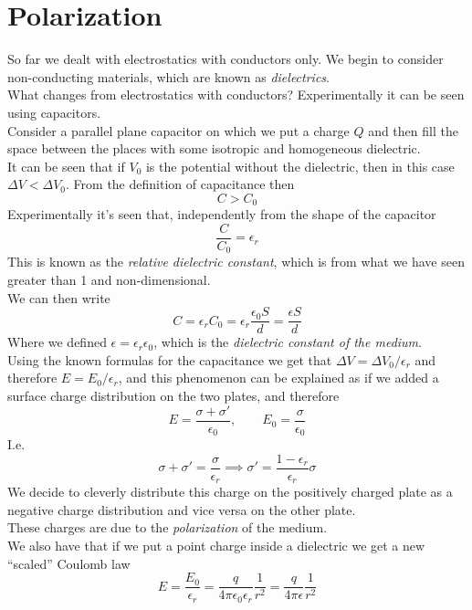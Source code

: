 \documentclass[../electromagnetism]{subfiles}
\begin{document}
\section{Polarization}
So far we dealt with electrostatics with conductors only. We begin to consider non-conducting materials, which are known as \textit{dielectrics}.\\
What changes from electrostatics with conductors? Experimentally it can be seen using capacitors.\\
Consider a parallel plane capacitor on which we put a charge $Q$ and then fill the space between the places with some isotropic and homogeneous dielectric.\\
It can be seen that if $V_0$ is the potential without the dielectric, then in this case $\Delta V<\Delta V_0$. From the definition of capacitance then
\begin{equation*}
	C>C_0
\end{equation*}
Experimentally it's seen that, independently from the shape of the capacitor
\begin{equation}
	\frac{C}{C_0}=\epsilon_r
	\label{eq:dielectricconst}
\end{equation}
This is known as the \textit{relative dielectric constant}, which is from what we have seen greater than 1 and non-dimensional.\\
We can then write
\begin{equation}
	C=\epsilon_rC_0=\epsilon_r\frac{\epsilon_0S}{d}=\frac{\epsilon S}{d}
	\label{eq:capdie}
\end{equation}
Where we defined $\epsilon=\epsilon_r\epsilon_0$, which is the \textit{dielectric constant of the medium}.\\
Using the known formulas for the capacitance we get that $\Delta V=\Delta V_0/\epsilon_r$ and therefore $E=E_0/\epsilon_r$, and this phenomenon can be explained as if we added a surface charge distribution on the two plates, and therefore
\begin{equation*}
	E=\frac{\sigma+\sigma'}{\epsilon_0},\qquad E_0=\frac{\sigma}{\epsilon_0}
\end{equation*}
I.e.
\begin{equation*}
	\sigma+\sigma'=\frac{\sigma}{\epsilon_r}\implies\sigma'=\frac{1-\epsilon_r}{\epsilon_r}\sigma
\end{equation*}
We decide to cleverly distribute this charge on the positively charged plate as a negative charge distribution and vice versa on the other plate.\\
These charges are due to the \textit{polarization} of the medium.\\
We also have that if we put a point charge inside a dielectric we get a new ``scaled'' Coulomb law
\begin{equation}
	E=\frac{E_0}{\epsilon_r}=\frac{q}{4\pi\epsilon_0\epsilon_r}\frac{1}{r^2}=\frac{q}{4\pi\epsilon}\frac{1}{r^2}
	\label{eq:coulombdie}
\end{equation}
\end{document}
